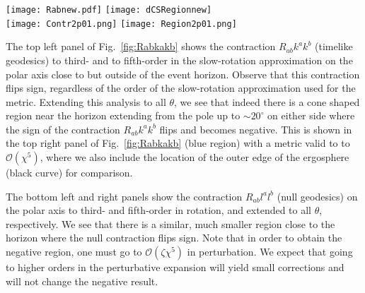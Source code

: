 \documentclass[prd,twocolumn,showpacs,superscriptaddress,nofootinbib]{revtex4-2}
\begin{document}
%
\begin{figure*}[htb]
\texttt{[image: Rabnew.pdf]}
 \texttt{[image: dCSRegionnew]}\\
 \texttt{[image: Contr2p01.png]}
  \texttt{[image: Region2p01.png]}
\caption{(color online) Dimensionless contraction of the Ricci tensor with the tangent vector of  timelike (top) and null (bottom) congruences $M^2 E[k] = M^2 R_{ab} k^a k^b$ and $M^2 E[k] = M^2 R_{ab} l^a l^b$ computed along the ($\theta=0$) polar axis (left panels) and in the $r$--$\theta$ plane (right panels). In the left panels, the red and blue curves denote $M^2 E[k]$ calculated with a BH solution in dCS gravity to third- and fifth-order in rotation, respectively, both for a black hole with dimensionless spin $\chi = 0.1$ and dimensionless dCS coupling $\zeta = 0.1$. In the right panels, we present $M^2 E[k]$ computed with a fifth-order in rotation dCS BH metric (blue shaded region) assuming $\chi = 0.1$ and $\zeta = 0.1$, and for comparison, we also present the outer edge of the ergosphere in dCS gravity. Observe that the contractions $R_{ab} k^a k^b$ and $R_{ab}l^al^b$ switch sign close to the horizon, in a cup-shaped region around the polar axis. Note that the x-axis on the right panels is given in $\theta$, not in $r/M$.
}\label{fig:Rabkakb}
\end{figure*}
The top left panel of Fig.~\ref{fig:Rabkakb} shows the contraction $R_{ab} k^a k^b$ (timelike geodesics) to third- and to fifth-order in the slow-rotation approximation on the polar axis close to but outside of the event horizon. Observe that this contraction flips sign, regardless of the order of the  slow-rotation approximation used for the metric. Extending this analysis to all $\theta$, we see that indeed there is a cone shaped region near the horizon extending from the pole up to $\sim 20^\circ$ on either side where the sign of the contraction $R_{ab}k^ak^b$ flips and becomes negative. This is shown in the top right panel of Fig.~\ref{fig:Rabkakb} (blue region) with a metric valid to to $\mathcal{O}(\chi^5)$, where we also include the location of the outer edge of the ergosphere (black curve) for comparison. 

The bottom left and right panels show the contraction $R_{ab} l^al^b$ (null geodesics) on the polar axis to third- and fifth-order in rotation, and extended to all $\theta$, respectively. We see that there is a similar, much smaller region close to the horizon where the null contraction flips sign. Note that in order to obtain the negative region, one must go to $\mathcal{O}(\zeta\chi^5)$ in perturbation. We expect that going to higher orders in the perturbative expansion will yield small corrections and will not change the negative result. %
\end{document}
